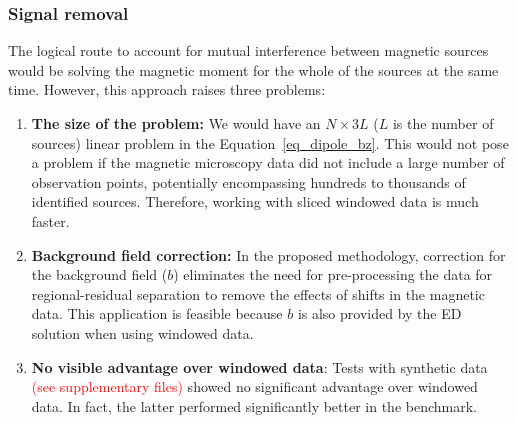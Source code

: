 
     

\subsubsection{Signal removal} 
    The logical route to account for mutual interference between magnetic sources would be solving the magnetic moment for the whole of the sources at the same time. However, this approach raises three problems:
    \begin{enumerate}
        \item \textbf{The size of the problem:} We would have an $N \times 3L$ ($L$ is the number of sources) linear problem in the Equation~\ref{eq_dipole_bz}. This would not pose a problem if the magnetic microscopy data did not include a large number of observation points, potentially encompassing hundreds to thousands of identified sources. Therefore, working with sliced windowed data is much faster.
        
        \item \textbf{Background field correction:} In the proposed methodology, correction for the background field ($b$) eliminates the need for pre-processing the data for regional-residual separation to remove the effects of shifts in the magnetic data. This application is feasible because $b$ is also provided by the ED solution when using windowed data.
        
        \item \textbf{No visible advantage over windowed data}: Tests with synthetic data \textcolor{red}{(see supplementary files)} showed no significant advantage over windowed data. In fact, the latter performed significantly better in the benchmark.

    \end{enumerate}
    
